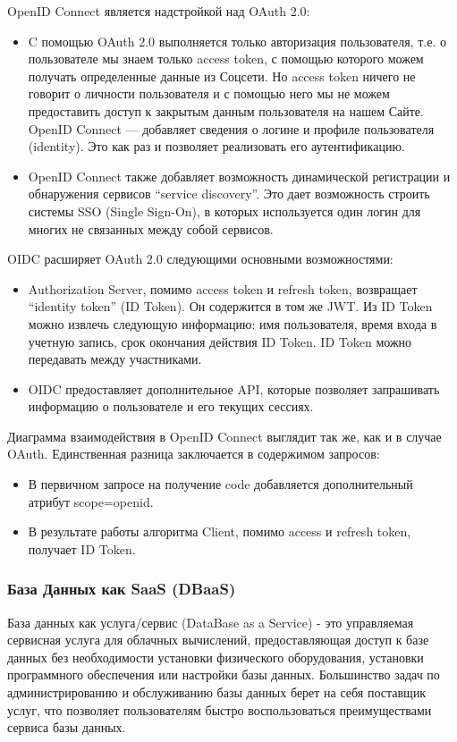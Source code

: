 OpenID Connect является надстройкой над OAuth 2.0:

\begin{itemize}
    \item C помощью OAuth 2.0 выполняется только авторизация пользователя, т.е. о пользователе мы знаем только access token, с помощью которого можем получать определенные данные из Соцсети. Но access token ничего не говорит о личности пользователя и с помощью него мы не можем предоставить доступ к закрытым данным пользователя на нашем Сайте. OpenID Connect — добавляет сведения о логине и профиле пользователя (identity). Это как раз и позволяет реализовать его аутентификацию.
    \item OpenID Connect также добавляет возможность динамической регистрации и обнаружения сервисов “service discovery”. Это дает возможность строить системы SSO (Single Sign-On), в которых используется один логин для многих не связанных между собой сервисов.\autocite{OpenIDConnect}
\end{itemize}

OIDC расширяет OAuth 2.0 следующими основными возможностями:

\begin{itemize}
    \item Authorization Server, помимо access token и refresh token, возвращает “identity token” (ID Token). Он содержится в том же JWT. Из ID Token можно извлечь следующую информацию: имя пользователя, время входа в учетную запись, срок окончания действия ID Token. ID Token можно передавать между участниками.
    \item OIDC предоставляет дополнительное API, которые позволяет запрашивать информацию о пользователе и его текущих сессиях.\autocite{IDToken}
\end{itemize}

Диаграмма взаимодействия в OpenID Connect выглядит так же, как и в случае OAuth. Единственная разница заключается в содержимом запросов:

\begin{itemize}
    \item В первичном запросе на получение code добавляется дополнительный атрибут scope=openid.
    \item В результате работы алгоритма Client, помимо access и refresh token, получает ID Token.\autocite{IDToken}
\end{itemize}

\subsubsection{База Данных как SaaS (DBaaS)}
База данных как услуга/сервис (DataBase as a Service) - это управляемая сервисная услуга для облачных вычислений, 
предоставляющая доступ к базе данных без необходимости установки физического оборудования, установки программного обеспечения 
или настройки базы данных. Большинство задач по администрированию и обслуживанию базы данных берет на себя поставщик услуг, 
что позволяет пользователям быстро воспользоваться преимуществами сервиса базы данных.


